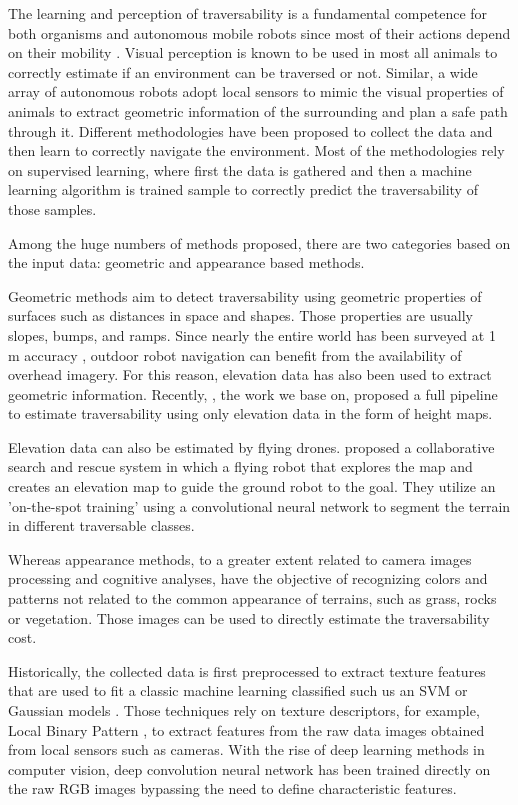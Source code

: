 The learning and perception of traversability is
a fundamental competence for both organisms and autonomous mobile robots since most of their
actions depend on their mobility \cite{ugur2010traversability}. Visual perception is known to be used in most all animals to correctly estimate if an environment can be traversed or not.
Similar, a wide array of autonomous robots adopt local sensors to mimic the visual properties of animals to extract geometric information of the surrounding and plan a safe path through it. Different methodologies have been proposed to collect the data and then learn to correctly navigate the environment.
Most of the methodologies rely on supervised learning, where first the data is gathered and then a machine learning algorithm is trained sample to correctly predict the traversability of those samples.

Among the huge numbers of methods proposed, there are two categories based on the input data: geometric and appearance based methods. 

Geometric methods aim to detect traversability using geometric properties of surfaces such as distances in space and shapes. Those properties are usually slopes, bumps, and ramps. Since nearly the entire world has been surveyed at 1 m accuracy \cite{sofman2006improving}, 
outdoor robot navigation can benefit from the availability of overhead imagery. For this reason, elevation data has also been used to extract geometric information. Recently, \cite{1709.05368}, the work we base on, proposed a full pipeline to estimate traversability using only elevation data in the form of height maps. 

Elevation data can also be estimated by flying drones. \cite{delmerico2016active} proposed a collaborative search and rescue system in which a flying robot that explores the map and creates an elevation map to guide the ground robot to the goal. They utilize an 'on-the-spot training' using a convolutional neural network to segment the terrain in different traversable classes.  

Whereas appearance methods, to a greater extent related to camera images processing and cognitive analyses, have the objective of recognizing colors and patterns not related to the common appearance of terrains, such as grass, rocks or vegetation. Those images can be used to directly estimate the traversability cost. 

Historically, the collected data is first preprocessed to extract texture features that are used to fit a classic machine learning classified such us an SVM \cite{ugur2010traversability} or Gaussian models \cite{sofman2006improving}. Those techniques rely on texture descriptors, for example, Local Binary Pattern \cite{ojala2002multiresolution}, to extract features from the raw data images obtained from local sensors such as cameras.
With the rise of deep learning methods in computer vision, deep convolution neural network has been trained directly on the raw RGB images bypassing the need to define characteristic features.

